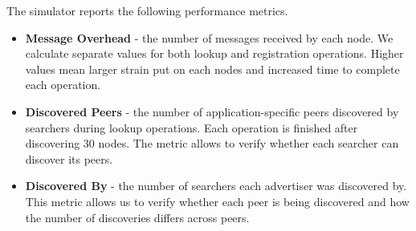  The simulator reports the following performance metrics. 
 \begin{itemize}
     \item \textbf{Message Overhead} - the number of messages received by each node. We calculate separate values for both lookup and registration operations. Higher values mean larger strain put on each nodes and increased time to complete each operation. 
     \item \textbf{Discovered Peers} - the number of application-specific peers discovered by searchers during lookup operations. Each operation is finished after discovering 30 nodes. The metric allows to verify whether each searcher can discover its peers.
     \item \textbf{Discovered By} - the number of searchers each advertiser was discovered by. This metric allows us to verify whether each peer is being discovered and how the number of discoveries differs across peers.
 \end{itemize}
 
